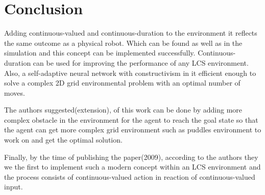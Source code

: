 \documentclass[12pt]{article}
\begin{document}
\section{Conclusion}
\label{sec:conc}
Adding continuous-valued and continuous-duration to the environment it reflects the same outcome as a physical robot. Which can be found as well as in the simulation and this concept can be implemented successfully. Continuous-duration can be used for improving the performance of any LCS environment. Also, a self-adaptive neural network with constructivism in it efficient enough to solve a complex 2D grid environmental problem with an optimal number of moves.

The authors suggested(extension), of this work can be done by adding more complex obstacle in the environment for the agent to reach the goal state so that the agent can get more complex grid environment such as puddles environment \cite{1554945} to work on and get the optimal solution.

Finally, by the time of publishing the paper(2009), according to the authors they we the first to implement such a modern concept within an LCS environment and the process consists of continuous-valued action in reaction of continuous-valued input.




\end{document}
